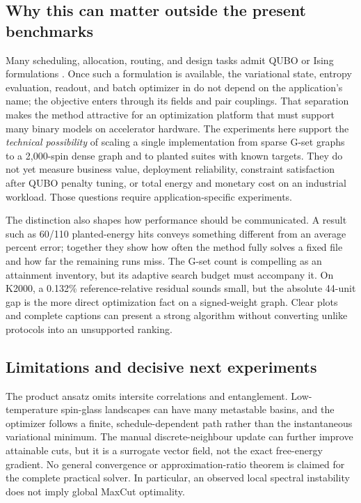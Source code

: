 \subsection{Why this can matter outside the present benchmarks}

Many scheduling, allocation, routing, and design tasks admit QUBO or
Ising formulations \citep{lucas2014}. Once such a formulation is
available, the variational state, entropy evaluation, readout, and
batch optimizer in \QeFEM{} do not depend on the application's name;
the objective enters through its fields and pair couplings. That
separation makes the method attractive for an optimization platform
that must support many binary models on accelerator hardware. The
experiments here support the \emph{technical possibility} of scaling a
single implementation from sparse G-set graphs to a 2,000-spin dense
graph and to planted suites with known targets. They do not yet measure
business value, deployment reliability, constraint satisfaction after
QUBO penalty tuning, or total energy and monetary cost on an industrial
workload. Those questions require application-specific experiments.

The distinction also shapes how performance should be communicated.
A result such as 60/110 planted-energy hits conveys something different
from an average percent error; together they show how often the method
fully solves a fixed file and how far the remaining runs miss. The
G-set count is compelling as an attainment inventory, but its adaptive
search budget must accompany it. On K2000, a 0.132\% reference-relative
residual sounds small, but the absolute 44-unit gap is the more direct
optimization fact on a signed-weight graph. Clear plots and complete
captions can present a strong algorithm without converting unlike
protocols into an unsupported ranking.

\subsection{Limitations and decisive next experiments}

The product ansatz omits intersite correlations and entanglement.
Low-temperature spin-glass landscapes can have many metastable basins,
and the optimizer follows a finite, schedule-dependent path rather than
the instantaneous variational minimum. The manual discrete-neighbour
update can further improve attainable cuts, but it is a surrogate
vector field, not the exact free-energy gradient. No general convergence
or approximation-ratio theorem is claimed for the complete practical
solver. In particular, an observed local spectral instability does not
imply global MaxCut optimality.


